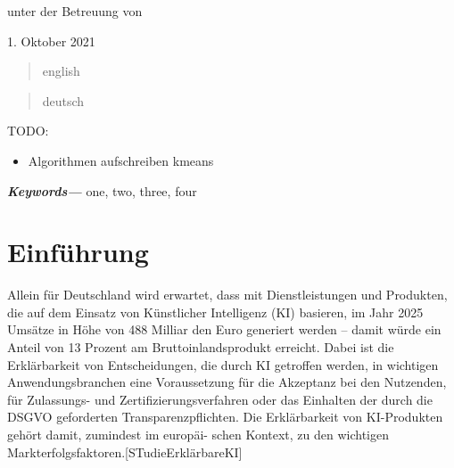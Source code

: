 \documentclass[11pt,a4paper]{article}
\providecommand{\keywords}[1]
{
	\small	
	\textbf{\textit{Keywords---}} #1
}
\numberwithin{equation}{section}
\begin{document}
\begin{titlepage}
		
		
	
	
		\vspace{1cm}
		unter der Betreuung von\par
		\centering
		\begin{figure}[h]
			
		\end{figure}
		{\large 1. Oktober 2021}
	\end{titlepage}
	
	
		
	\begin{abstract}english\end{abstract}
	\begin{abstract}deutsch\end{abstract}
	TODO:
	\begin{itemize}
		\item Algorithmen aufschreiben kmeans

	\end{itemize}
	\keywords{one, two, three, four}
	\newpage
	\listoffigures
	
	\listoftables
	
	\lstlistoflistings
	
	\listofalgorithms
	\newpage
	\tableofcontents
	\newpage
	\section{Einführung}
	Allein für Deutschland wird erwartet, dass mit Dienstleistungen und Produkten, die auf dem
	Einsatz von Künstlicher Intelligenz (KI) basieren, im Jahr 2025 Umsätze in Höhe von 488 Milliar­
	den Euro generiert werden – damit würde ein Anteil von 13 Prozent am Bruttoinlandsprodukt
	erreicht. Dabei ist die Erklärbarkeit von Entscheidungen, die durch KI getroffen werden, in
	wichtigen Anwendungsbranchen eine Voraussetzung für die Akzeptanz bei den Nutzenden, für
	Zulassungs- und Zertifizierungsverfahren oder das Einhalten der durch die DSGVO geforderten
	Transparenzpflichten. Die Erklärbarkeit von KI-Produkten gehört damit, zumindest im europäi-
	schen Kontext, zu den wichtigen Markterfolgsfaktoren.[STudieErklärbareKI]
	
\end{document}
